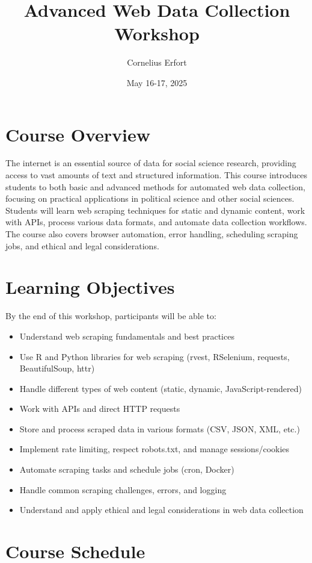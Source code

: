 \documentclass[12pt]{article}
\title{Advanced Web Data Collection Workshop}
\author{Cornelius Erfort}
\date{May 16-17, 2025}
\begin{document}
\maketitle

\section*{Course Overview}
The internet is an essential source of data for social science research, providing access to vast amounts of text and structured information. This course introduces students to both basic and advanced methods for automated web data collection, focusing on practical applications in political science and other social sciences. Students will learn web scraping techniques for static and dynamic content, work with APIs, process various data formats, and automate data collection workflows. The course also covers browser automation, error handling, scheduling scraping jobs, and ethical and legal considerations.

\section*{Learning Objectives}
By the end of this workshop, participants will be able to:
\begin{itemize}
    \item Understand web scraping fundamentals and best practices
    \item Use R and Python libraries for web scraping (rvest, RSelenium, requests, BeautifulSoup, httr)
    \item Handle different types of web content (static, dynamic, JavaScript-rendered)
    \item Work with APIs and direct HTTP requests
    \item Store and process scraped data in various formats (CSV, JSON, XML, etc.)
    \item Implement rate limiting, respect robots.txt, and manage sessions/cookies
    \item Automate scraping tasks and schedule jobs (cron, Docker)
    \item Handle common scraping challenges, errors, and logging
    \item Understand and apply ethical and legal considerations in web data collection
\end{itemize}

\newpage
\section*{Course Schedule}
\end{document}
